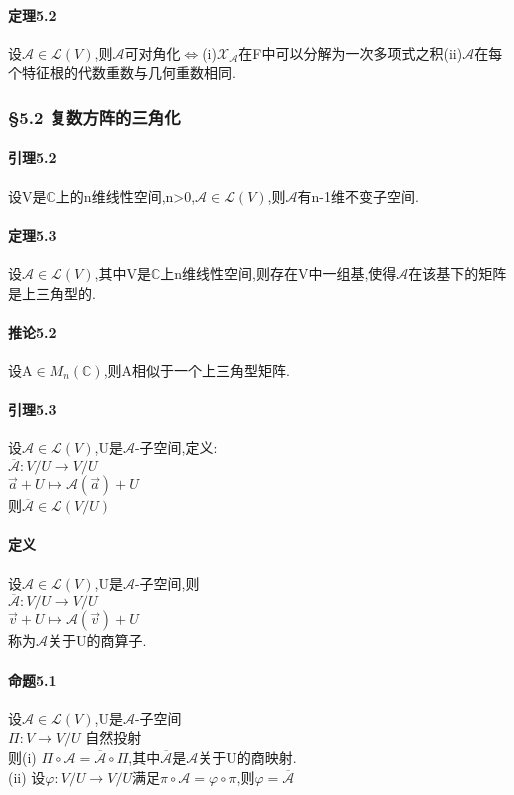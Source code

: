\documentclass{ctexart}
\begin{document}
\paragraph{定理5.2}
设$\mathcal{A}\in\mathcal{L}(V)$,则$\mathcal{A}$可对角化$\Leftrightarrow$(i)$\mathcal{X}_{\mathcal{A}}$在F中可以分解为一次多项式之积(ii)$\mathcal{A}$在每个特征根的代数重数与几何重数相同.
\subsubsection{§5.2 复数方阵的三角化}
\paragraph{引理5.2}
设V是$\mathbb{C}$上的n维线性空间,n>0,$\mathcal{A}\in\mathcal{L}(V)$,则$\mathcal{A}$有n-1维不变子空间.
\paragraph{定理5.3}
设$\mathcal{A}\in\mathcal{L}(V)$,其中V是$\mathbb{C}$上n维线性空间,则存在V中一组基,使得$\mathcal{A}$在该基下的矩阵是上三角型的.
\paragraph{推论5.2}
设A$\in M_{n}(\mathbb{C})$,则A相似于一个上三角型矩阵.
\paragraph{引理5.3}
设$\mathcal{A}\in\mathcal{L}(V)$,U是$\mathcal{A}$-子空间,定义: \\
$\overline{\mathcal{A}}:V/U \to V/U$\\
$\vec{a}+U\mapsto\mathcal{A}(\vec{a})+U$\\
则$\overline{\mathcal{A}}\in\mathcal{L}(V/U)$
\paragraph{定义}
设$\mathcal{A}\in\mathcal{L}(V)$,U是$\mathcal{A}$-子空间,则\\
$\overline{\mathcal{A}}:V/U \to V/U$\\
$\vec{v}+U\mapsto\mathcal{A}(\vec{v})+U$\\
称为$\mathcal{A}$关于U的商算子.
\paragraph{命题5.1}
设$\mathcal{A}\in\mathcal{L}(V)$,U是$\mathcal{A}$-子空间\\
$\Pi : V \to V/U$ 自然投射\\
则(i)  $\Pi \circ \mathcal{A} = \overline{\mathcal{A}} \circ \Pi$,其中$\overline{\mathcal{A}}$是$\mathcal{A}$关于U的商映射.\\
(ii) 设$\varphi : V/U \to V/U$满足$\pi \circ \mathcal{A} = \varphi \circ \pi$,则$\varphi = \overline{\mathcal{A}}$
\end{document}
